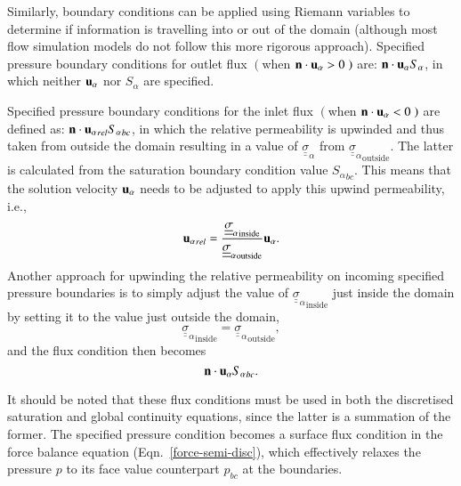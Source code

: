 \documentclass[preprint,authoryear,12pt]{elsarticle}
\begin{document}
Similarly, boundary conditions can be applied using Riemann variables to determine if information is travelling into or out of the domain (although most flow simulation models do not follow this more rigorous approach). Specified pressure boundary conditions for outlet flux $\left(\right.$when ${\bf n}\cdot {\bf u}_\alpha>0\left.\right)$ are: ${\bf n}\cdot {\bf u}_\alpha {S_\alpha}$, in which neither ${\bf u}_\alpha$ nor ${S_\alpha}$ are specified. 

Specified pressure boundary conditions for the inlet flux $\left(\right.$when ${\bf n}\cdot {\bf u}_\alpha<0\left.\right)$ are defined as: ${\bf n}\cdot {{\bf u}_\alpha}_{rel} {S_\alpha}_{bc}$, in which the relative permeability is upwinded and thus taken from outside the domain resulting in a value of ${\underline {\underline \sigma}}_\alpha$ from ${{\underline {\underline \sigma}}_\alpha}_{\text{outside}}$. The latter is calculated from the saturation boundary condition value ${S_\alpha}_{bc}$. This means that the solution velocity ${{\bf u}_\alpha}$ needs to be adjusted to apply this upwind permeability, i.e., 
\begin{equation}
  {{\bf u}_\alpha}_{rel}= \displaystyle\frac{{{\underline {\underline \sigma}}_\alpha}_\text{inside} } {{{\underline {\underline \sigma}}_\alpha}_\text{outside}}{{\bf u}_\alpha}.
\end{equation}
Another approach for upwinding the relative permeability on incoming specified pressure boundaries is to simply adjust the value of ${{\underline {\underline \sigma}}_\alpha}_\text{inside}$ just inside the domain by setting it to the value just outside the domain, 
\begin{displaymath}
{{\underline {\underline \sigma}}_\alpha}_\text{inside}={{\underline {\underline \sigma}}_\alpha}_\text{outside},
\end{displaymath}
and the flux condition then becomes
\begin{displaymath}
{\bf n}\cdot{{\bf u}_\alpha} {S_\alpha}_{bc}.
\end{displaymath}

It should be noted that these flux conditions must be used in both the discretised saturation and global continuity equations, since the latter is a summation of the former. The specified pressure condition becomes a surface flux condition in the force balance equation (Eqn.~\ref{force-semi-disc}), which effectively relaxes the pressure $p$ to its face value counterpart $p_{bc}$ at the boundaries. 

\end{document}
